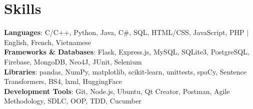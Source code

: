 \documentclass[letterpaper,11pt]{article}
\begin{document}
\section{\textbf{\Large Skills}}
  \begin{itemize}[leftmargin=0.15in, label={}]
    \small{
    \item{
    \textbf{Languages}{: C/C++, Python, Java, C\#, SQL, HTML/CSS, JavaScript, PHP $|$ English, French, Vietnamese} \\
    \textbf{Frameworks \& Databases}{: Flask, Express.js, MySQL, SQLite3, PostgreSQL, Firebase, MongoDB, Neo4J, JUnit, Selenium} \\
    \textbf{Libraries}{: pandas, NumPy, matplotlib, scikit-learn, unittests, spaCy, Sentence Transformers, BS4, lxml, HuggingFace } \\
    \textbf{Development Tools}{: Git, Node.js, Ubuntu, Qt Creator, Postman, Agile Methodology, SDLC, OOP, TDD, Cucumber} \\
    }}
  \end{itemize}
\end{document}
